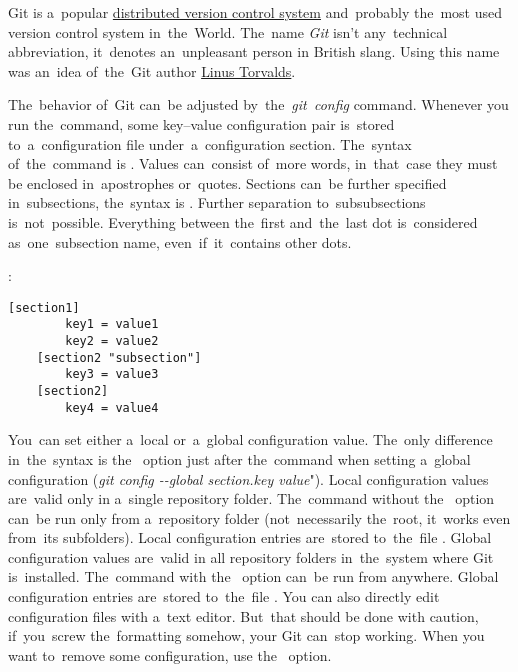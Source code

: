 \label{git}
Git is a~popular \hyperref[distributedversioncontrolsystem]{distributed version control system} and~probably the~most used version control system in~the~World.
The~name \textit{Git} isn't any~technical abbreviation, it~denotes an~unpleasant person in British slang.
Using this name was an~idea of~the~Git author \href{https://en.wikipedia.org/wiki/Linus_Torvalds}{Linus Torvalds}.

\label{gitconfig}
The~behavior of~Git can~be adjusted by~the~\textit{git~config} command.
Whenever you run the~command, some key--value configuration pair is~stored to~a~configuration file under~a~configuration section.
The~syntax of~the~command is .
Values can~consist of~more words, in~that~case they must be enclosed in~apostrophes or~quotes.
Sections can~be further specified in~subsections, the~syntax is .
Further separation to~subsubsections is~not~possible.
Everything between the~first and~the~last dot is~considered as~one~subsection name, even~if~it~contains other dots.

:
\begin{lstlisting}[frame=no]
    [section1]
        key1 = value1
        key2 = value2
    [section2 "subsection"]
        key3 = value3
    [section2]
        key4 = value4
\end{lstlisting}
\newline

\enlargethispage{-8mm}
\noindent  You~can set either a~local or~a~global configuration value.
The~only difference in~the~syntax is the~ option just after the~command when setting a~global configuration (\textit{git config \mbox{-{}-global} section.key value}").
Local configuration values are~valid only in a~single repository folder.
The~command without the~ option can~be run only from a~repository folder (not~necessarily the~root, it~works even from~its subfolders).
Local configuration entries are~stored to~the~file .
Global configuration values are~valid in all repository folders in~the~system where Git is~installed.
The~command with the~ option can~be run from anywhere.
Global configuration entries are~stored to~the~file .
You can also directly edit configuration files with a~text editor.
But~that should be done with caution, if~you~screw the~formatting somehow, your Git can~stop working.
When you want to~remove some configuration, use the~ option.

